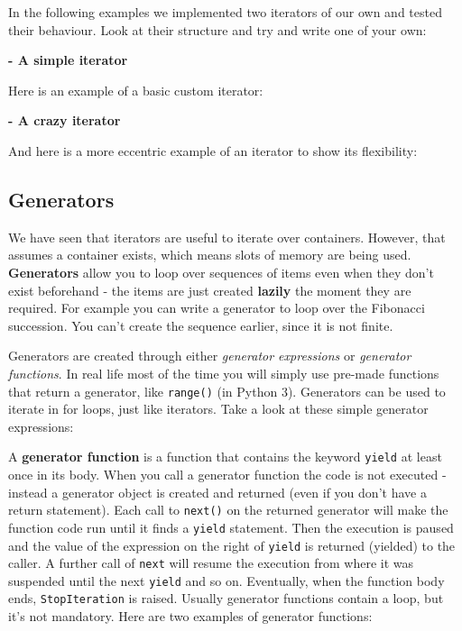 

In the following examples we implemented two iterators of our own and tested their behaviour. Look at their structure and try and write one of your own:

\textbf{- A simple iterator}

Here is an example of a basic custom iterator:

\hrulefill


\bigskip

\textbf{- A crazy iterator}

And here is a more eccentric example of an iterator to show its flexibility:

\hrulefill


\subsection{Generators}

We have seen that iterators are useful to iterate over containers. However, that assumes a container exists, which means slots of memory are being used.
\textbf{Generators} allow you to loop over sequences of items even when they don't exist beforehand - the items are just created \textbf{lazily} the moment they are required. For example you can write a generator to loop over the Fibonacci succession. You can't create the sequence earlier, since it is not finite.

Generators are created through either \textit{generator expressions} or \textit{generator functions}. In real life most of the time you will simply use pre-made functions that return a generator, like \texttt{range()} (in Python 3). Generators can be used to iterate in for loops, just like iterators. Take a look at these simple generator expressions:



A \textbf{generator function} is a function that contains the keyword \texttt{yield} at least once in its body. When you call a generator function the code is not executed - instead a generator object is created and returned (even if you don't have a return statement). Each call to \texttt{next()} on the returned generator will make the function code run until it finds a \texttt{yield} statement. Then the execution is paused and the value of the expression on the right of \texttt{yield} is returned (yielded) to the caller. A further call of \texttt{next} will resume the execution from where it was suspended until the next \texttt{yield} and so on. Eventually, when the function body ends, \texttt{StopIteration} is raised. Usually generator functions contain a loop, but it's not mandatory.
Here are two examples of generator functions:

